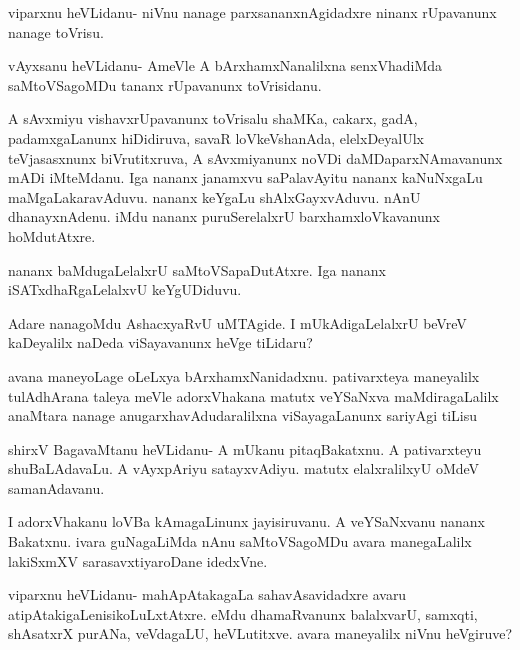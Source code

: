 \documentclass{article}
\begin{document}
\begin{mng}%
viparxnu heVLidanu- niVnu nanage parxsananxnAgidadxre ninanx rUpavanunx
nanage toVrisu.
\end{mng}

\begin{mng}%
vAyxsanu heVLidanu- AmeVle A bArxhamxNanalilxna senxVhadiMda
saMtoVSagoMDu tananx rUpavanunx toVrisidanu.
\end{mng}

\begin{mng}%
A sAvxmiyu vishavxrUpavanunx toVrisalu shaMKa, cakarx,
gadA, padamxgaLanunx hiDidiruva, savaR loVkeVshanAda, elelxDeyalUlx teVjasasxnunx
biVrutitxruva, A sAvxmiyanunx noVDi daMDaparxNAmavanunx mADi iMteMdanu.
Iga nananx janamxvu saPalavAyitu nananx kaNuNxgaLu maMgaLakaravAduvu.
nananx keYgaLu shAlxGayxvAduvu. nAnU dhanayxnAdenu. iMdu nananx 
puruSerelalxrU barxhamxloVkavanunx hoMdutAtxre.
\end{mng}

\begin{mng}%
nananx baMdugaLelalxrU saMtoVSapaDutAtxre. Iga nananx
iSATxdhaRgaLelalxvU keYgUDiduvu.
\end{mng}

\begin{mng}%
Adare nanagoMdu AshacxyaRvU uMTAgide. I mUkAdigaLelalxrU
beVreV kaDeyalilx naDeda viSayavanunx heVge tiLidaru?
\end{mng}

\begin{mng}%
avana maneyoLage oLeLxya bArxhamxNanidadxnu.
pativarxteya maneyalilx tulAdhArana taleya meVle adorxVhakana matutx veYSaNxva
maMdiragaLalilx anaMtara nanage anugarxhavAdudaralilxna viSayagaLanunx sariyAgi
tiLisu
\end{mng}

\begin{mng}%
shirxV BagavaMtanu heVLidanu- A mUkanu pitaqBakatxnu. A pativarxteyu
shuBaLAdavaLu. A vAyxpAriyu satayxvAdiyu. matutx elalxralilxyU
oMdeV samanAdavanu.
\end{mng}

\begin{mng}%
I adorxVhakanu loVBa kAmagaLinunx jayisiruvanu. A
veYSaNxvanu nananx Bakatxnu. ivara guNagaLiMda nAnu saMtoVSagoMDu avara
manegaLalilx lakiSxmXV sarasavxtiyaroDane idedxVne.
\end{mng}

\begin{mng}%
viparxnu heVLidanu- mahApAtakagaLa sahavAsavidadxre avaru
atipAtakigaLenisikoLuLxtAtxre. eMdu dhamaRvanunx balalxvarU, samxqti, shAsatxrX
purANa, veVdagaLU, heVLutitxve. avara maneyalilx niVnu heVgiruve?
\end{mng}
\end{document}
